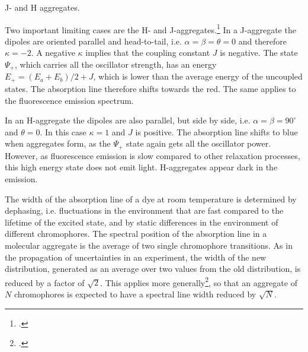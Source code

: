 \begin{marginfigure}

\caption{J- and H aggregates.}
\end{marginfigure}

Two important limiting cases are the H- and J-aggregates.\footcite[chapters 2.1.4.3, 2.2.5.3]{KoehlerBaessler2015} In a J-aggregate the dipoles are oriented parallel and head-to-tail, i.e. $\alpha = \beta = \theta = 0$ and therefore $\kappa = -2$. A negative $\kappa$ implies that the coupling constant $J$ is negative. The state $\Psi_+$, which carries all the oscillator strength, has an energy $E_+ = (E_a + E_b) / 2 + J$, which is lower than the average energy of the uncoupled states. The absorption line therefore shifts towards the red. The same applies to the fluorescence emission spectrum.

In an H-aggregate the dipoles are also parallel, but side by side, i.e. $\alpha = \beta = 90^\circ$ and $\theta = 0$. In this case $\kappa =1$ and $J$ is positive. The absorption line shifts to blue when aggregates form, as the $\Psi_+$ state again gets all the oscillator power. However, as fluorescence emission is slow compared to other relaxation processes, this high energy state does not emit light. H-aggregates appear dark in the emission.

The width of the absorption line of a dye at room temperature is determined by dephasing, i.e. fluctuations in the environment that are fast compared to the lifetime of the excited state, and by static differences in the environment of different chromophores. The spectral position of the absorption line in a molecular aggregate is the average of two single chromophore transitions. As in the propagation of uncertainties in an experiment, the width of the new distribution, generated as an average over two values from the old distribution, is reduced by a factor of $\sqrt{2}$. This applies more generally\footcite{Knapp1984}, so that an aggregate of $N$ chromophores is expected to have a spectral line width reduced by $\sqrt{N}$.







\printbibliography[segment=\therefsegment,heading=subbibliography]


